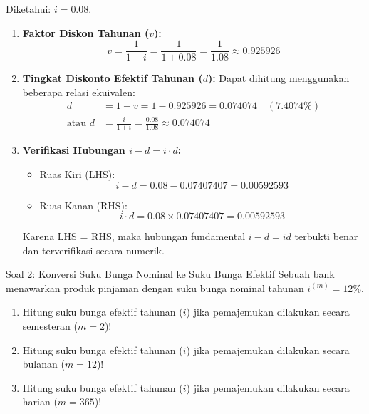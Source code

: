 \documentclass[11pt,a4paper]{article}
\begin{document}
\begin{solutionbox}[Soal 1]
Diketahui: $i = 0.08$.
\begin{enumerate}[label=(\alph*)]
    \item \textbf{Faktor Diskon Tahunan ($v$):}
    \begin{equation*}
        v = \frac{1}{1 + i} = \frac{1}{1 + 0.08} = \frac{1}{1.08} \approx \mathbf{0.925926}
    \end{equation*}

    \item \textbf{Tingkat Diskonto Efektif Tahunan ($d$):}
    Dapat dihitung menggunakan beberapa relasi ekuivalen:
    \begin{align*}
        d &= 1 - v = 1 - 0.925926 = \mathbf{0.074074} \quad (7.4074\%) \\[0.3em]
        \text{atau } d &= \frac{i}{1 + i} = \frac{0.08}{1.08} \approx \mathbf{0.074074}
    \end{align*}

    \item \textbf{Verifikasi Hubungan $i - d = i \cdot d$:}
    \begin{itemize}
        \item Ruas Kiri (LHS):
        \begin{equation*}
            i - d = 0.08 - 0.07407407 = \mathbf{0.00592593}
        \end{equation*}
        \item Ruas Kanan (RHS):
        \begin{equation*}
            i \cdot d = 0.08 \times 0.07407407 = \mathbf{0.00592593}
        \end{equation*}
    \end{itemize}
    Karena LHS = RHS, maka hubungan fundamental $i - d = id$ terbukti benar dan terverifikasi secara numerik.
\end{enumerate}
\end{solutionbox}

\vspace{1.2em}

\begin{problembox}{Soal 2: Konversi Suku Bunga Nominal ke Suku Bunga Efektif}
Sebuah bank menawarkan produk pinjaman dengan suku bunga nominal tahunan $i^{(m)} = 12\%$.
\begin{enumerate}[label=(\alph*)]
    \item Hitung suku bunga efektif tahunan ($i$) jika pemajemukan dilakukan secara semesteran ($m = 2$)!
    \item Hitung suku bunga efektif tahunan ($i$) jika pemajemukan dilakukan secara bulanan ($m = 12$)!
    \item Hitung suku bunga efektif tahunan ($i$) jika pemajemukan dilakukan secara harian ($m = 365$)!
\end{enumerate}
\end{problembox}
\end{document}
